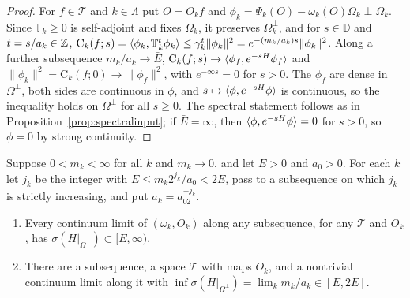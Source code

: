 \begin{proof}
For $f\in\mathcal T$ and $k\in\Lambda$ put $O=O_kf$ and $\phi_k=\Psi_k(O)-
\omega_k(O)\Omega_k\perp\Omega_k$. Since $\mathbb T_k\ge0$ is self-adjoint and
fixes $\Omega_k$, it preserves $\Omega_k^\perp$, and for $s\in\mathbb D$ and
$t=s/a_k\in\mathbb{Z}$, $\mathrm C_k(f;s)=\langle \phi_k,\mathbb T_k^t\phi_k\rangle\le\gamma_k^t
\|\phi_k\|^2=e^{-(m_k/a_k)s}\|\phi_k\|^2$. Along a further subsequence $m_k/a_k
\to\bar E$, $\mathrm C_k(f;s)\to\langle \phi_f,e^{-sH}\phi_f\rangle$ and $\|\phi_k\|^2=
\mathrm C_k(f;0)\to\|\phi_f\|^2$, with $e^{-\infty s}=0$ for $s>0$. The $\phi_f$
are dense in $\Omega^\perp$, both sides are continuous in $\phi$, and $s\mapsto
\langle \phi,e^{-sH}\phi\rangle$ is continuous, so the inequality holds on $\Omega^\perp$
for all $s\ge0$. The spectral statement follows as in
Proposition~\ref{prop:spectralinput}; if $\bar E=\infty$, then $\langle \phi,e^{-sH}
\phi\rangle=0$ for $s>0$, so $\phi=0$ by strong continuity.
\end{proof}

\begin{theorem}\label{thm:gaptuning}
Suppose $0<m_k<\infty$ for all $k$ and $m_k\to0$, and let $E>0$ and $a_0>0$.
For each $k$ let $j_k$ be the integer with $E\le m_k2^{j_k}/a_0<2E$, pass to a
subsequence on which $j_k$ is strictly increasing, and put $a_k=a_02^{-j_k}$.
\begin{enumerate}[label=\textup{(\alph*)},leftmargin=*]
\item Every continuum limit of $(\omega_k,O_k)$ along any subsequence, for any
$\mathcal T$ and $O_k$, has $\sigma(H|_{\Omega^\perp})\subset[E,\infty)$.
\item There are a subsequence, a space $\mathcal T$ with maps $O_k$, and a
nontrivial continuum limit along it with $\inf\sigma(H|_{\Omega^\perp})=\lim_k
m_k/a_k\in[E,2E]$.
\end{enumerate}
\end{theorem}

